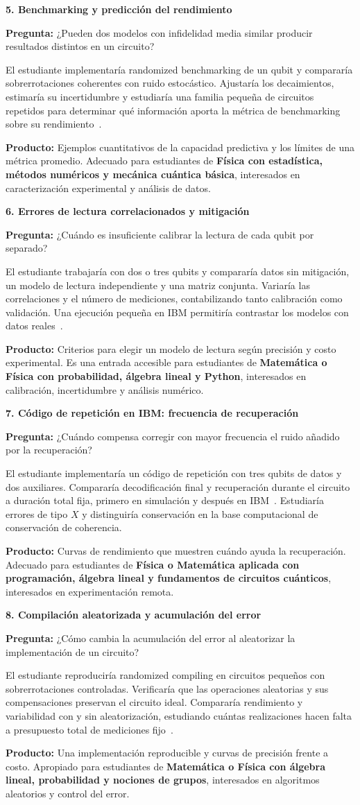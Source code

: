 \documentclass[11pt,a4paper]{article}
\newcommand{\tema}[5]{%
\noindent\begin{minipage}{\linewidth}\raggedright
\textbf{#1. #2}\par
\textbf{Pregunta:} #3\par
#4\par
\textbf{Producto:} #5
\end{minipage}\par\vspace{9pt}}
\begin{document}
\tema{5}{Benchmarking y predicción del rendimiento}
{¿Pueden dos modelos con infidelidad media similar producir resultados distintos en un circuito?}
{El estudiante implementaría randomized benchmarking de un qubit y compararía sobrerrotaciones coherentes con ruido estocástico. Ajustaría los decaimientos, estimaría su incertidumbre y estudiaría una familia pequeña de circuitos repetidos para determinar qué información aporta la métrica de benchmarking sobre su rendimiento~\cite{rb}.}
{Ejemplos cuantitativos de la capacidad predictiva y los límites de una métrica promedio. Adecuado para estudiantes de \textbf{Física con estadística, métodos numéricos y mecánica cuántica básica}, interesados en caracterización experimental y análisis de datos.}

\tema{6}{Errores de lectura correlacionados y mitigación}
{¿Cuándo es insuficiente calibrar la lectura de cada qubit por separado?}
{El estudiante trabajaría con dos o tres qubits y compararía datos sin mitigación, un modelo de lectura independiente y una matriz conjunta. Variaría las correlaciones y el número de mediciones, contabilizando tanto calibración como validación. Una ejecución pequeña en IBM permitiría contrastar los modelos con datos reales~\cite{readout}.}
{Criterios para elegir un modelo de lectura según precisión y costo experimental. Es una entrada accesible para estudiantes de \textbf{Matemática o Física con probabilidad, álgebra lineal y Python}, interesados en calibración, incertidumbre y análisis numérico.}

\tema{7}{Código de repetición en IBM: frecuencia de recuperación}
{¿Cuándo compensa corregir con mayor frecuencia el ruido añadido por la recuperación?}
{El estudiante implementaría un código de repetición con tres qubits de datos y dos auxiliares. Compararía decodificación final y recuperación durante el circuito a duración total fija, primero en simulación y después en IBM~\cite{wootton,ibmrep}. Estudiaría errores de tipo $X$ y distinguiría conservación en la base computacional de conservación de coherencia.}
{Curvas de rendimiento que muestren cuándo ayuda la recuperación. Adecuado para estudiantes de \textbf{Física o Matemática aplicada con programación, álgebra lineal y fundamentos de circuitos cuánticos}, interesados en experimentación remota.}

\tema{8}{Compilación aleatorizada y acumulación del error}
{¿Cómo cambia la acumulación del error al aleatorizar la implementación de un circuito?}
{El estudiante reproduciría randomized compiling en circuitos pequeños con sobrerrotaciones controladas. Verificaría que las operaciones aleatorias y sus compensaciones preservan el circuito ideal. Compararía rendimiento y variabilidad con y sin aleatorización, estudiando cuántas realizaciones hacen falta a presupuesto total de mediciones fijo~\cite{rc}.}
{Una implementación reproducible y curvas de precisión frente a costo. Apropiado para estudiantes de \textbf{Matemática o Física con álgebra lineal, probabilidad y nociones de grupos}, interesados en algoritmos aleatorios y control del error.}
\end{document}
